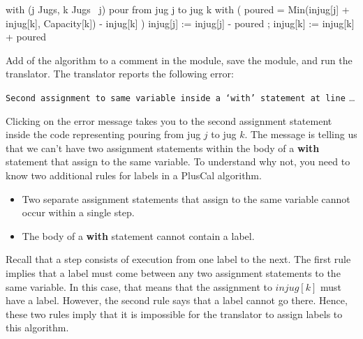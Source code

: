 \documentclass[fleqn,leqno]{article}
\begin{document}
\bigskip
\begin{nopcal}
with (j \in Jugs, k \in Jugs \ {j}) \* pour from jug j to jug k
                { with ( poured = 
                           Min(injug[j] + injug[k], Capacity[k]) - injug[k] )
                    { injug[j] := injug[j] - poured ;
                      injug[k] := injug[k] + poured
                    }
                }
\end{nopcal}
\begin{tlatex}
\@xx{}%
%
%
%
%
\end{tlatex}

\bigskip

Add  of the algorithm
to a comment in the module, save the module, and run the translator.
The translator reports the following error:
\begin{display}
\texttt{Second assignment to same variable inside a `with' statement at line} \ldots 
\end{display}
Clicking on the error message takes you to the second assignment
statement inside the code representing pouring from jug $j$ to jug
$k$.  The message is telling us that we can't have two
assignment statements within the body of a \textbf{with} statement
that assign to the same variable.  To understand why not, you need to
know two additional 
rules for labels in a PlusCal algorithm.
\begin{itemize}
\item Two separate assignment statements that assign to the
same variable cannot occur within a single step.

\item The body of a \textbf{with} statement cannot contain a label.
\end{itemize}
Recall that a step consists of execution from one label to the next.
The first rule implies that a label must come between any two
assignment statements to the same variable.  In this case, that means
that the assignment to $injug[k]$ must have a label.  However, the
second rule says that a label cannot go there.  Hence, these two rules
imply that it is impossible for the translator to assign labels to
this algorithm.
\end{document}
